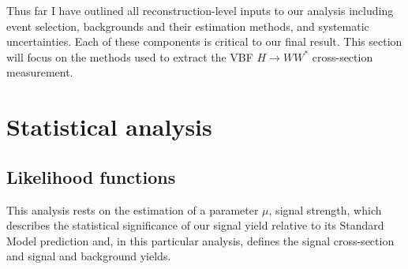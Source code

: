 Thus far I have outlined all reconstruction-level inputs to our analysis including event selection, backgrounds and their estimation methods, and systematic uncertainties. Each of these components is critical to our final result. This section will focus on the methods used to extract the VBF $H\rightarrow WW^*$ cross-section measurement. 
\section{Statistical analysis}
\subsection{Likelihood functions}
This analysis rests on the estimation of a parameter $\mu$, signal strength, which describes the statistical significance of our signal yield relative to its Standard Model prediction and, in this particular analysis, defines the signal cross-section and signal and background yields. 

